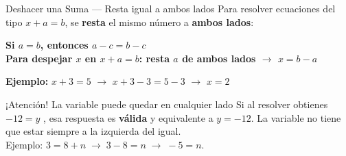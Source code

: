 \documentclass[12pt, letterpaper]{article}
\begin{document}
	\begin{concepto}{Deshacer una Suma — Resta igual a ambos lados}
		Para resolver ecuaciones del tipo $x + a = b$, se \textbf{resta} el mismo
		número a \textbf{ambos lados}:
		
		\vspace{0.3cm}
		\begin{tcolorbox}[enhanced, colback=vallightblue, colframe=valblue, arc=3pt]
			\centering\large\bfseries
			Si $a = b$, entonces $a - c = b - c$\\[4pt]
			\normalsize\normalfont
			Para despejar $x$ en $x + a = b$:\; resta $a$ de \textbf{ambos} lados $\rightarrow$ $x = b - a$
		\end{tcolorbox}
		
		\vspace{0.3cm}
		\textbf{Ejemplo:} $x + 3 = 5$ \hspace*{5mm} $\rightarrow$ \hspace*{5mm}
		$x + 3 - 3 = 5 - 3$  \hspace*{5mm} $\rightarrow$  \hspace*{5mm} $x = 2$
	\end{concepto}
	
	\begin{atencion}{¡Atención! La variable puede quedar en cualquier lado}
		Si al resolver obtienes $-12 = y$ , esa respuesta es \textbf{válida}
		y equivalente a $y = -12$. La variable no tiene que estar siempre a la izquierda del igual.\\
		Ejemplo: $3= 8+n \;\rightarrow\; 3 - 8 = n \;\rightarrow\; -5 = n$.
	\end{atencion}
	
\end{document}
